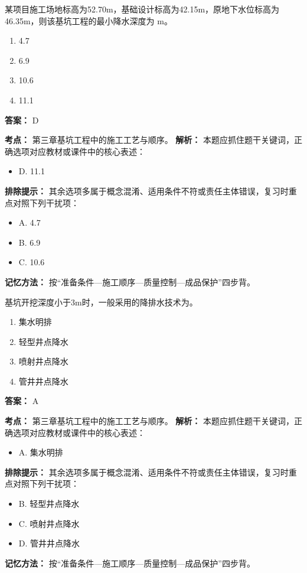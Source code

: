\documentclass[UTF8,fontset=fandol,11pt]{ctexart}
\begin{document}
\vspace{0.2em}

\begin{quizbox}[title={第 11 题}]
某项目施工场地标高为52.70m，基础设计标高为42.15m，原地下水位标高为46.35m，则该基坑工程的最小降水深度为 m。\\
\begin{enumerate}[label=\Alph*.]
\item 4.7
\item 6.9
\item 10.6
\item 11.1
\end{enumerate}
\textbf{答案：} D
\vspace{0.25em}
\begin{answerbox}[title={考点解析}]
\textbf{考点：} 第三章基坑工程中的施工工艺与顺序。
\textbf{解析：} 本题应抓住题干关键词，正确选项对应教材或课件中的核心表述：
\begin{itemize}
\item D. 11.1
\end{itemize}
\textbf{排除提示：} 其余选项多属于概念混淆、适用条件不符或责任主体错误，复习时重点对照下列干扰项：
\begin{itemize}
\item A. 4.7
\item B. 6.9
\item C. 10.6
\end{itemize}
\textbf{记忆方法：} 按“准备条件—施工顺序—质量控制—成品保护”四步背。
\end{answerbox}
\end{quizbox}

\vspace{0.2em}

\begin{quizbox}[title={第 12 题}]
基坑开挖深度小于3m时，一般采用的降排水技术为。\\
\begin{enumerate}[label=\Alph*.]
\item 集水明排
\item 轻型井点降水
\item 喷射井点降水
\item 管井井点降水
\end{enumerate}
\textbf{答案：} A
\vspace{0.25em}
\begin{answerbox}[title={考点解析}]
\textbf{考点：} 第三章基坑工程中的施工工艺与顺序。
\textbf{解析：} 本题应抓住题干关键词，正确选项对应教材或课件中的核心表述：
\begin{itemize}
\item A. 集水明排
\end{itemize}
\textbf{排除提示：} 其余选项多属于概念混淆、适用条件不符或责任主体错误，复习时重点对照下列干扰项：
\begin{itemize}
\item B. 轻型井点降水
\item C. 喷射井点降水
\item D. 管井井点降水
\end{itemize}
\textbf{记忆方法：} 按“准备条件—施工顺序—质量控制—成品保护”四步背。
\end{answerbox}
\end{quizbox}
\end{document}
